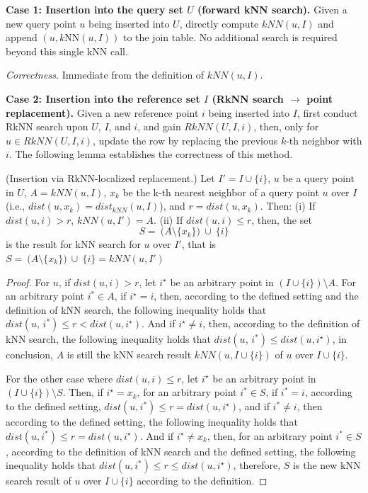 \noindent\textbf{Case 1: Insertion into the query set $U$ (forward kNN search).}
Given a new query point $u$ being inserted into $U$, directly compute $kNN(u,I)$ and append $(u, k\mathrm{NN}(u,I))$ to the join table. No additional search is required beyond this single kNN call.

\noindent\emph{Correctness.} Immediate from the definition of $kNN(u,I)$.

\noindent \textbf{Case 2: Insertion into the reference set $I$ (RkNN search $\rightarrow$ point replacement).}
Given a new reference point $i$ being inserted into $I$, first conduct RkNN search upon $U$, $I$, and $i$, and gain $RkNN(U,I,i)$, then, only for $u\in RkNN(U,I,i)$, update the row by replacing the previous $k$-th neighbor with $i$. The following lemma establishes the correctness of this method.

\begin{lemma}(Insertion via RkNN-localized replacement.)
\label{lm:insertquery}
    Let $I' = I\cup\{i\}$, $u$ be a query point in $U$, $A=kNN(u,I)$, $x_k$ be the k-th nearest neighbor of a query point $u$ over $I$ (i.e., $dist(u,x_k)=dist_{kNN}(u,I)$), and $r=dist(u,x_k)$. Then:
(i) If $dist(u,i)>r$, $kNN(u,I')=A$.
(ii) If $dist(u,i)\le r$, then, the set
\[
S=\ \big(A\setminus\{x_k\}\big)\ \cup\ \{i\}
\] is the result for kNN search for $u$ over $I'$, that is $S=\ \big(A\setminus\{x_k\}\big)\ \cup\ \{i\}=kNN(u,I')$
\end{lemma}

\begin{proof}
For $u$, if $dist(u,i)>r$, let $i^{\star}$ be an arbitrary point in $(I\cup \{i\})\setminus A$. For an arbitrary point $i^{*} \in A$, if $i^{\star}=i$, then, according to the defined setting and the definition of kNN search, the following inequality holds that $dist(u,\,i^{*})\leq r<dist(u,i^{\star})$. And if $i^{\star}\neq i$, then, according to the definition of kNN search, the following inequality holds that $dist(u, \, i^{*})\leq dist(u, i^{\star})$, in conclusion, $A$ is still the kNN search result $kNN(u,I\cup\{i\})$ of $u$ over $I\cup\{i\}$. 

For the other case where $dist(u,i)\leq r$, let $i^{\star}$ be an arbitrary point in $(I\cup \{i\})\setminus S$. Then, if $i^{\star}=x_k$, for an arbitrary point $i^{*}\in S$, if $i^{*}=i$, according to the defined setting, $dist(u, i^{*})\leq r=dist(u, i^{\star})$, and if $i^{*}\neq i$, then according to the defined setting, the following inequality holds that $dist(u,i^{*})\leq r=dist(u,i^{\star})$. And if $i^{\star}\neq x_k$, then, for an arbitrary point $i^{*}\in S$, according to the definition of kNN search and the defined setting, the following inequality holds that $dist(u,i^{*})\leq r\leq dist(u,i^{\star})$, therefore, $S$ is the new kNN search result of $u$ over $I\cup\{i\}$ according to the definition.
\end{proof}


